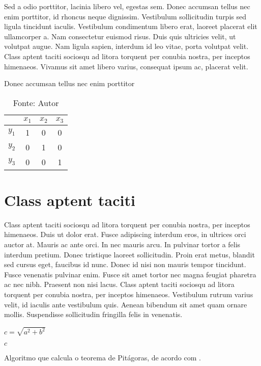 \documentclass[xindy,acronym,symbols]{fei}
\begin{document}
Sed a odio porttitor, lacinia libero vel, egestas sem. Donec accumsan tellus nec enim porttitor, id rhoncus neque dignissim. Vestibulum sollicitudin turpis sed ligula tincidunt iaculis. Vestibulum condimentum libero erat, laoreet placerat elit ullamcorper a. Nam consectetur euismod risus. Duis quis ultricies velit, ut volutpat augue. Nam ligula sapien, interdum id leo vitae, porta volutpat velit. Class aptent taciti sociosqu ad litora torquent per conubia nostra, per inceptos himenaeos. Vivamus sit amet libero varius, consequat ipsum ac, placerat velit.

\begin{table}[ht!]
	\caption{Donec accumsan tellus nec enim porttitor} \label{tbl:exemplo}
	\centering
	\begin{tabular}{|c|c|c|c|}
		\hline
		        & \(x_1\) & \(x_2\) & \(x_3\) \\
		\hline
		\(y_1\) & 1       & 0       & 0       \\
		\hline
		\(y_2\) & 0       & 1       & 0       \\
		\hline
		\(y_3\) & 0       & 0       & 1       \\
		\hline
	\end{tabular}
	\caption*{Fonte: Autor}
\end{table}

\section{Class aptent taciti}

Class aptent taciti sociosqu ad litora torquent per conubia nostra, per  inceptos himenaeos. Duis ut dolor erat. Fusce adipiscing interdum eros, in ultrices orci auctor at. Mauris ac ante orci. In nec mauris arcu. In pulvinar tortor a felis interdum pretium. Donec tristique laoreet sollicitudin. Proin erat metus, blandit sed cursus eget, faucibus id nunc. Donec id nisi non mauris tempor tincidunt. Fusce venenatis pulvinar enim. Fusce sit amet tortor nec magna feugiat pharetra ac nec nibh. Praesent non nisi lacus. Class aptent taciti sociosqu ad litora torquent per conubia nostra, per inceptos himenaeos. Vestibulum rutrum varius velit, id iaculis ante vestibulum quis. Aenean bibendum sit amet quam ornare mollis. Suspendisse sollicitudin fringilla felis in venenatis.

\begin{algorithm}

	\(c=\sqrt{a^2 + b^2}\)

	\Retorna \(c\)

	\caption{Algoritmo que calcula o teorema de Pitágoras, de acordo com \textcite{heath1921history}.}
	\label{lst:alg}
\end{algorithm}

\printbibliography
\end{document}
